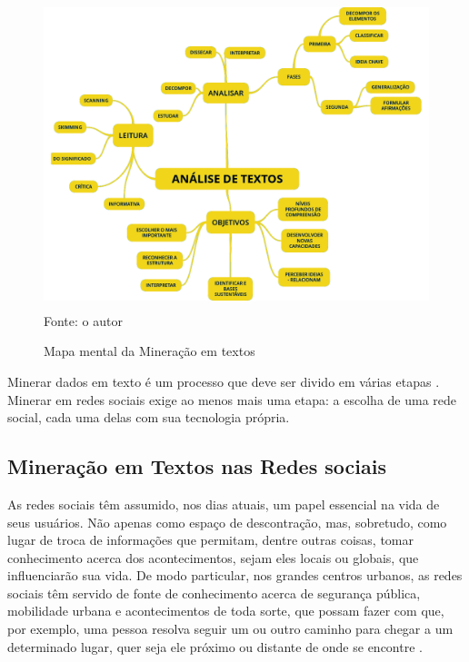 \begin{figure}[htpb]
	\centering
	\caption{Mapa mental da Mineração em textos}
	\includegraphics[width=160mm, height=90mm]{Figuras/BigData/Analise_Textos2.png}\\
	\tiny Fonte: o autor
\end{figure}


Minerar dados em texto é um processo que deve ser divido em várias etapas \cite{Lima2012}. Minerar em redes sociais exige ao menos mais uma etapa: a escolha de uma rede social, cada uma delas com sua tecnologia própria.

\subsection{Mineração em Textos nas Redes sociais}


As redes sociais têm assumido, nos dias atuais, um papel essencial na vida de seus usuários. Não apenas como espaço de descontração, mas, sobretudo, como lugar de troca de informações que permitam, dentre outras coisas, tomar conhecimento acerca dos acontecimentos, sejam eles locais ou globais, que influenciarão sua vida. De modo particular, nos grandes centros urbanos, as redes sociais têm servido de fonte de conhecimento acerca de segurança pública, mobilidade urbana e acontecimentos de toda sorte, que possam fazer com que, por exemplo, uma pessoa resolva seguir um ou outro caminho para chegar a um determinado lugar, quer seja ele próximo ou distante de onde se encontre \cite{sarker2015utilizing} \cite{madden2013teens} \cite{naaman2010really}.

